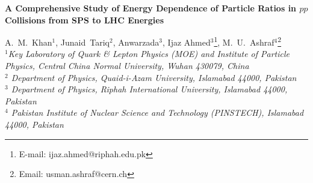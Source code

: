\documentclass{article}
\newcommand{\sqrts}{\mbox{$\sqrt{\mathrm{s}}$}}
\providecommand{\keywords}[1]{\textbf{\textit{Keywords---}} #1}
\begin{document}

\begin{center}
{\Large \bf A Comprehensive Study of Energy Dependence of Particle Ratios in $pp$ Collisions from SPS to LHC Energies }

\vskip1.0cm

A.~M.~Khan$^{1}$,
Junaid~Tariq$^{2}$,
Anwarzada$^{3}$, 
Ijaz Ahmed$^{3}${\footnote{E-mail: ijaz.ahmed@riphah.edu.pk}},
M.~U.~Ashraf$^{4}${\footnote{Email: usman.ashraf@cern.ch}}\\

{\small\it 
$^1$Key Laboratory of Quark \& Lepton Physics (MOE) and Institute of Particle Physics,
Central China Normal University, Wuhan 430079, China\\
$^2$ Department of Physics, Quaid-i-Azam University, Islamabad 44000, Pakistan\\
$^3$ Department of Physics, Riphah International University, Islamabad 44000, Pakistan\\
$^4$ Pakistan Institute of Nuclear Science and Technology (PINSTECH), Islamabad 44000, Pakistan\\

}
\end{center}


\vskip1.0cm


\begin{abstract}

A comprehensive study has been preformed to estimate the kaon to pion ($K^+$/$\pi^+$, $K^-$/$\pi^-$) ratio and total kaon to total pion ($K$/$\pi$) ratio as a function of energy in $pp$ collisions at different energies i.e., \sqrts~= 6.3, 17.3, 62.4, 200, 900 GeV, 2.76 TeV, 7 TeV, 13 TeV and 14 TeV using EPOS1.99, EPOS LHC, HIJING, QGSJET II and Sibyll model simulations. Significant presence of horn in $K^+$/$\pi^+$ and $K^-$/$\pi^-$ ratio is suggested by experimental data at lower energies, which is confirmed by HIJING and EPOS LHC model. A smooth increase in $K/\pi$ ratio is also seen at higher energies. The current model simulations predict the similar increase in the ratio with increasing energies. Almost all the models suggest a saturation in $K/\pi$ ratio at the LHC energies. On the basis of previous available measurements, we also give predictions of these ratios at \sqrts~= 13 and 14 TeV. All the model predictions at \sqrts~= 13 and 14 TeV suggest a saturation in the ratio at higher energies. However, QGSJTE II predictions are higher as compared to other models.      

\vskip0.5cm
\keywords{collisions, simulation, function, energy, prediction}
\end{abstract}
\end{document}
